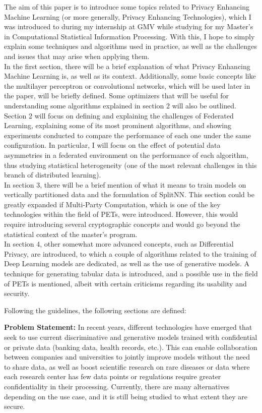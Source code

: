 \documentclass[oneside, openany]{book}
\begin{document}

\small{
The aim of this paper is to introduce some topics related to Privacy Enhancing Machine Learning (or more generally, Privacy Enhancing Technologies), which I was introduced to during my internship at GMV while studying for my Master’s in Computational Statistical Information Processing. With this, I hope to simply explain some techniques and algorithms used in practice, as well as the challenges and issues that may arise when applying them.\\
In the first section, there will be a brief explanation of what Privacy Enhancing Machine Learning is, as well as its context. Additionally, some basic concepts like the multilayer perceptron or convolutional networks, which will be used later in the paper, will be briefly defined. Some optimizers that will be useful for understanding some algorithms explained in section 2 will also be outlined.\\
Section 2 will focus on defining and explaining the challenges of Federated Learning, explaining some of its most prominent algorithms, and showing experiments conducted to compare the performance of each one under the same configuration. In particular, I will focus on the effect of potential data asymmetries in a federated environment on the performance of each algorithm, thus studying statistical heterogeneity (one of the most relevant challenges in this branch of distributed learning).\\
In section 3, there will be a brief mention of what it means to train models on vertically partitioned data and the formulation of SplitNN. This section could be greatly expanded if Multi-Party Computation, which is one of the key technologies within the field of PETs, were introduced. However, this would require introducing several cryptographic concepts and would go beyond the statistical context of the master’s program.\\
In section 4, other somewhat more advanced concepts, such as Differential Privacy, are introduced, to which a couple of algorithms related to the training of Deep Learning models are dedicated, as well as the use of generative models. A technique for generating tabular data is introduced, and a possible use in the field of PETs is mentioned, albeit with certain criticisms regarding its usability and security.

Following the guidelines, the following sections are defined:

\textbf{Problem Statement:} In recent years, different technologies have emerged that seek to use current discriminative and generative models trained with confidential or private data (banking data, health records, etc.). This can enable collaboration between companies and universities to jointly improve models without the need to share data, as well as boost scientific research on rare diseases or data where each research center has few data points or regulations require greater confidentiality in their processing. Currently, there are many alternatives depending on the use case, and it is still being studied to what extent they are secure.

}
\end{document}
